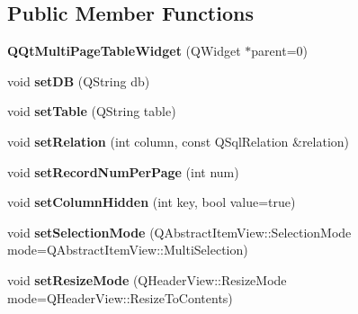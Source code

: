 \subsection*{Public Member Functions}
\begin{DoxyCompactItemize}
\item 
\mbox{\label{class_q_qt_multi_page_table_widget_a7d0a9629be1044878f574c34428c5ff2}} 
{\bfseries Q\+Qt\+Multi\+Page\+Table\+Widget} (Q\+Widget $\ast$parent=0)
\item 
\mbox{\label{class_q_qt_multi_page_table_widget_a726cff78085003ea970c6acb09971d8c}} 
void {\bfseries set\+DB} (Q\+String db)
\item 
\mbox{\label{class_q_qt_multi_page_table_widget_aae342d5d93fd2c525be62d38aa795e05}} 
void {\bfseries set\+Table} (Q\+String table)
\item 
\mbox{\label{class_q_qt_multi_page_table_widget_a65b124bdc8536f27f5207080ff240ad8}} 
void {\bfseries set\+Relation} (int column, const Q\+Sql\+Relation \&relation)
\item 
\mbox{\label{class_q_qt_multi_page_table_widget_ab825cab6143e067c6b3a166d52b07b6e}} 
void {\bfseries set\+Record\+Num\+Per\+Page} (int num)
\item 
\mbox{\label{class_q_qt_multi_page_table_widget_a79ac77ba71ae325934d2a01d0c68a060}} 
void {\bfseries set\+Column\+Hidden} (int key, bool value=true)
\item 
\mbox{\label{class_q_qt_multi_page_table_widget_aafbff3306cdd0e7120d4402d1670a5b9}} 
void {\bfseries set\+Selection\+Mode} (Q\+Abstract\+Item\+View\+::\+Selection\+Mode mode=Q\+Abstract\+Item\+View\+::\+Multi\+Selection)
\item 
\mbox{\label{class_q_qt_multi_page_table_widget_ab33f0ced6d8f505fde4c561aa4627c12}} 
void {\bfseries set\+Resize\+Mode} (Q\+Header\+View\+::\+Resize\+Mode mode=Q\+Header\+View\+::\+Resize\+To\+Contents)
\item 

\end{DoxyCompactItemize}
